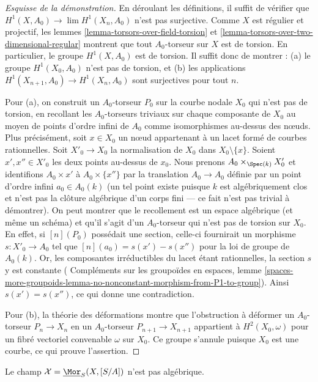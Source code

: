 \begin{proof}[Esquisse de la démonstration]
En déroulant les définitions, il suffit de vérifier que
$H^1(X, A_0) \to \lim H^1(X_n, A_0)$ n'est pas surjective.
Comme $X$ est régulier et projectif, les
lemmes \ref{lemma-torsors-over-field-torsion} et
\ref{lemma-torsors-over-two-dimensional-regular}
montrent que tout $A_0$-torseur sur $X$ est
de torsion. En particulier, le groupe $H^1(X, A_0)$ est de torsion.
Il suffit donc de montrer :
(a) le groupe $H^1(X_0, A_0)$ n'est pas de torsion, et
(b) les applications $H^1(X_{n + 1}, A_0) \to H^1(X_n, A_0)$ sont surjectives pour tout $n$.

\medskip\noindent
Pour (a), on construit un $A_0$-torseur $P_0$ sur la courbe nodale $X_0$
qui n'est pas de torsion, en recollant les $A_0$-torseurs triviaux sur chaque
composante de $X_0$ au moyen de points d'ordre infini de $A_0$ comme
isomorphismes au-dessus des nœuds. Plus précisément, soit $x \in X_0$ un nœud
appartenant à un lacet formé de courbes rationnelles.
Soit $X'_0 \to X_0$ la normalisation de $X_0$ dans $X_0 \setminus \{x\}$.
Soient $x', x'' \in X'_0$ les deux points au-dessus de $x_0$.
Nous prenons $A_0 \times_{\Spec(k)} X'_0$ et identifions
$A_0 \times {x'}$ à $A_0 \times \{x''\}$ par la translation
$A_0 \to A_0$ définie par un point d'ordre infini $a_0 \in A_0(k)$
(un tel point existe puisque $k$ est algébriquement clos et n'est pas la
clôture algébrique d'un corps fini --- ce fait n'est pas trivial à démontrer).
On peut montrer que le recollement est un espace algébrique (et même
un schéma) et qu'il s'agit d'un $A_0$-torseur qui n'est pas de torsion sur $X_0$.
En effet, si $[n](P_0)$ possédait une section, celle-ci fournirait un morphisme
$s : X'_0 \to A_0$ tel que
$[n](a_0) = s(x') - s(x'')$ pour la loi de groupe de $A_0(k)$. Or,
les composantes irréductibles du lacet étant rationnelles, la section $s$
y est constante (
Compléments sur les groupoïdes en espaces, lemme
\ref{spaces-more-groupoids-lemma-no-nonconstant-morphism-from-P1-to-group}).
Ainsi $s(x') = s(x'')$, ce qui donne une contradiction.

\medskip\noindent
Pour (b), la théorie des déformations montre que l'obstruction à déformer un $A_0$-torseur $P_n \to X_n$ en un $A_0$-torseur
$P_{n + 1} \to X_{n + 1}$ appartient à $H^2(X_0, \omega)$
pour un fibré vectoriel convenable $\omega$ sur $X_0$.
Ce groupe s'annule puisque $X_0$ est une courbe, ce qui prouve l'assertion.
\end{proof}

\begin{proposition}
\label{proposition-nonalghomstack}
Le champ $\mathcal{X} = \underline{\Mor}_S(X, [S/A])$ n'est pas algébrique.
\end{proposition}

